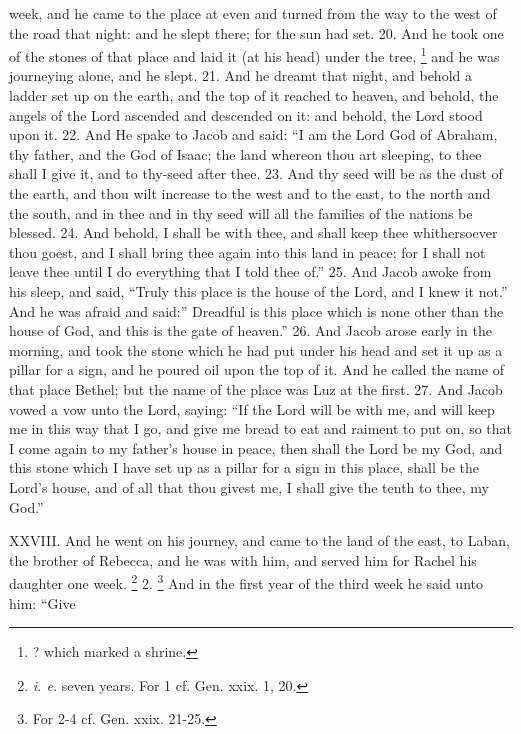 week, and he came to the place at even and turned from the way to the west of the road that night: and he slept there; for the sun had set. 20. And he took one of the stones of that place and laid it (at his head) under the tree, \footnote{? which marked a shrine.} and he was journeying alone, and he slept. 21. And he dreamt that night, and behold a ladder set up on the earth, and the top of it reached to heaven, and behold, the angels of the Lord ascended and descended on it: and behold, the Lord stood upon it. 22. And He spake to Jacob and said: ``I am the Lord God of Abraham, thy father, and the God of Isaac; the land whereon thou art sleeping, to thee shall I give it, and to thy-seed after thee. 23. And thy seed will be as the dust of the earth, and thou wilt increase to the west and to the east, to the north and the south, and in thee and in thy seed will all the families of the nations be blessed. 24. And behold, I shall be with thee, and shall keep thee whithersoever thou goest, and I shall bring thee again into this land in peace; for I shall not leave thee until I do everything that I told thee of.'' 25. And Jacob awoke from his sleep, and said, ``Truly this place is the house of the Lord, and I knew it not.'' And he was afraid and said:'' Dreadful is this place which is none other than the house of God, and this is the gate of heaven.'' 26. And Jacob arose early in the morning, and took the stone which he had put under his head and set it up as a pillar for a sign, and he poured oil upon the top of it. And he called the name of that place Bethel; but the name of the place was Luz at the first. 27. And Jacob vowed a vow unto the Lord, saying: ``If the Lord will be with me, and will keep me in this way that I go, and give me bread to eat and raiment to put on, so that I come again to my father's house in peace, then shall the Lord be my God, and this stone which I have set up as a pillar for a sign in this place, shall be the Lord's house, and of all that thou givest me, I shall give the tenth to thee, my God.''


XXVIII. And he went on his journey, and came to the land of the east, to Laban, the brother of Rebecca, and he was with him, and served him for Rachel his daughter one week. \footnote{\emph{i. e.} seven years. For 1 cf. Gen. xxix. 1, 20.} 2. \footnote{For 2-4 cf. Gen. xxix. 21-25.} And in the first year of the third week he said unto him: ``Give

